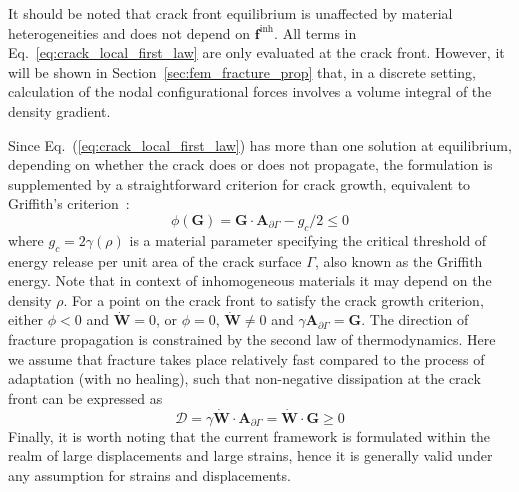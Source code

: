 \documentclass[onecolumn]{svjour3}
\begin{document}
It should be noted that crack front equilibrium is unaffected by material heterogeneities and does not depend on $\mathbf f^{\mathrm {inh}}$. All terms in Eq.~\ref{eq:crack_local_first_law} are only evaluated at the crack front. However, it will be shown in Section~\ref{sec:fem_fracture_prop} that, in a discrete setting, calculation of the nodal configurational forces involves a volume integral of the density gradient.

Since Eq.~(\ref{eq:crack_local_first_law}) has more than one solution at equilibrium, depending on whether the crack 
does or does not propagate, the formulation is supplemented by a straightforward criterion for crack growth, equivalent to Griffith's  criterion~\cite{kaczmarczyk2017energy}:
\begin{equation} \label{eq:grif1}
\phi(\mathbf{G}) = 
\mathbf{G} \cdot \mathbf{A}_{\partial\Gamma} - g_c/2 \leq 0
\end{equation} 
where $g_c=2\gamma(\rho)$ is a material parameter specifying the critical threshold of energy release
per unit area of the crack surface $\Gamma$, also known as the Griffith energy. Note that in context of inhomogeneous materials it may depend on the density $\rho$. For a point on the crack front to satisfy the crack growth criterion, 
either $\phi<0$ and $\dot{\mathbf{W}}=0$, or $\phi=0$, $\dot{\mathbf{W}}\ne 0$ and $\gamma\mathbf{A}_{\partial\Gamma}=\mathbf{G}$. 
% 
% 
The direction of fracture propagation is
constrained by the second law of thermodynamics. Here we assume that fracture takes place
relatively fast compared to the process of adaptation (with no healing), 
such that non-negative dissipation at the crack front can be expressed as
\begin{equation}
	\mathcal{D} = \gamma \dot{\mathbf{W}} \cdot \mathbf{A}_{\partial\Gamma}= \dot{\mathbf{W}} \cdot \mathbf{G}\ge0
\end{equation}
% 
Finally, it is worth noting that the current framework is formulated within 
the realm of large displacements and large strains, hence it 
is generally valid under any assumption for strains and displacements. 
\end{document}
